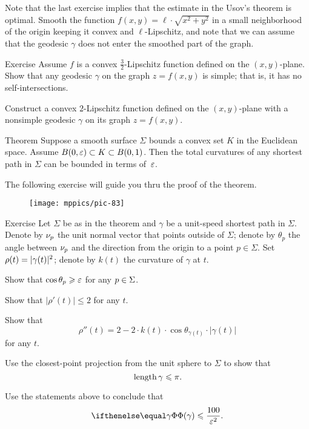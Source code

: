 Note that the last exercise implies that the estimate in the Usov's theorem is optimal. Smooth the function $f(x,y)=\ell\cdot\sqrt{x^2+y^2}$ in a small neighborhood of the origin keeping it convex and $\ell$-Lipschitz,
and note that we can assume that the geodesic $\gamma$ does not enter the smoothed part of the graph.


\begin{thm}{Exercise}\label{ex:rough-bound-mountain}
Assume $f$ is a convex $\tfrac32$-Lipschitz function defined on the $(x,y)$-plane.
Show that any geodesic $\gamma$ on the graph $z=f(x,y)$ is simple;
that is, it has no self-intersections.

Construct a convex $2$-Lipschitz function defined on the $(x,y)$-plane
with a nonsimple geodesic $\gamma$ on its graph $z=f(x,y)$.
\end{thm}


\begin{thm}{Theorem}\label{thm:tc-of-mingeod}
Suppose a smooth surface $\Sigma$ bounds a convex set $K$ in the Euclidean space.
Assume $B(0,\varepsilon)\subset K\subset B(0,1)$.
Then the total curvatures of any shortest path in $\Sigma$ can be bounded in terms of~$\varepsilon$. 
\end{thm}

The following exercise will guide you thru the proof of the theorem. 

\begin{wrapfigure}{r}{48 mm}
\vskip-0mm
\centering
\texttt{[image: mppics/pic-83]}
\vskip-0mm
\end{wrapfigure}

\begin{thm}{Exercise}\label{ex:bound-tc}
Let $\Sigma$ be as in the theorem and $\gamma$ be a unit-speed shortest path in $\Sigma$.
Denote by $\nu_p$ the unit normal vector that points outside of $\Sigma$;
denote by $\theta_p$ the angle between $\nu_p$ and the direction from the origin to a point $p\in\Sigma$.
Set $\rho(t)\z=|\gamma(t)|^2$; denote by $k(t)$ the curvature of $\gamma$ at $t$.

\begin{subthm}{}
Show that $\cos\theta_p\geqslant \varepsilon$ for any $p\z\in \Sigma$.
\end{subthm}

\begin{subthm}{}
 Show that $|\rho'(t)|\le 2$ for any $t$.
\end{subthm}

\begin{subthm}{}
 Show that 
\[\rho''(t)=2-2\cdot k(t)\cdot \cos \theta_{\gamma(t)}\cdot |\gamma(t)|\]
for any $t$.
\end{subthm}

\begin{subthm}{}
 Use the closest-point projection from the unit sphere to $\Sigma$ to show that 
\[\mathop{\rm length}\nolimits \gamma\leqslant \pi.\]
\end{subthm}

\begin{subthm}{}
 Use the statements above to conclude that 
\[\tc\gamma\le \frac{100}{\eps^2}.\]
\end{subthm}

\end{thm}

